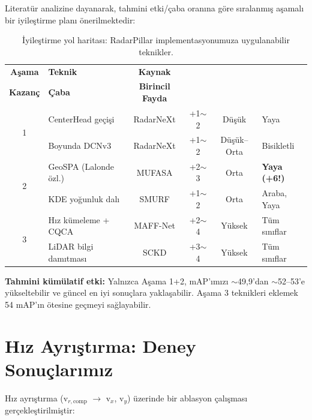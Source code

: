 \documentclass[a4paper,11pt]{article}
\begin{document}
Literatür analizine dayanarak, tahmini etki/çaba oranına göre sıralanmış aşamalı bir iyileştirme planı önerilmektedir:

\begin{table}[H]
\centering
\caption{İyileştirme yol haritası: RadarPillar implementasyonumuza uygulanabilir teknikler.}
\label{tab:roadmap}
\small
\renewcommand{\arraystretch}{1.2}
\begin{tabular}{@{}clcccl@{}}
\toprule
\textbf{Aşama} & \textbf{Teknik} & \textbf{Kaynak} & \makecell{\textbf{Tah.\ mAP}\\\textbf{Kazanç}} & \textbf{Çaba} & \textbf{Birincil Fayda} \\
\midrule
\multirow{2}{*}{1} & CenterHead geçişi         & RadarNeXt  & +1$\sim$2 & Düşük       & Yaya \\
                    & Boyunda DCNv3             & RadarNeXt  & +1$\sim$2 & Düşük--Orta & Bisikletli \\
\midrule
\multirow{2}{*}{2} & GeoSPA (Lalonde özl.)     & MUFASA     & +2$\sim$3 & Orta        & \textbf{Yaya (+6!)} \\
                    & KDE yoğunluk dalı         & SMURF      & +1$\sim$2 & Orta        & Araba, Yaya \\
\midrule
\multirow{2}{*}{3} & Hız kümeleme + CQCA       & MAFF-Net   & +2$\sim$4 & Yüksek      & Tüm sınıflar \\
                    & LiDAR bilgi damıtması     & SCKD       & +3$\sim$4 & Yüksek      & Tüm sınıflar \\
\bottomrule
\end{tabular}
\end{table}

\noindent
\textbf{Tahmini kümülatif etki:} Yalnızca Aşama 1+2, mAP'ımızı ${\sim}$49{,}9'dan ${\sim}$52--53'e yükseltebilir ve güncel en iyi sonuçlara yaklaşabilir. Aşama 3 teknikleri eklemek 54 mAP'ın ötesine geçmeyi sağlayabilir.

\section{Hız Ayrıştırma: Deney Sonuçlarımız}

Hız ayrıştırma (v$_{r,\text{comp}}$ $\to$ v$_x$, v$_y$) üzerinde bir ablasyon çalışması gerçekleştirilmiştir:
\end{document}
